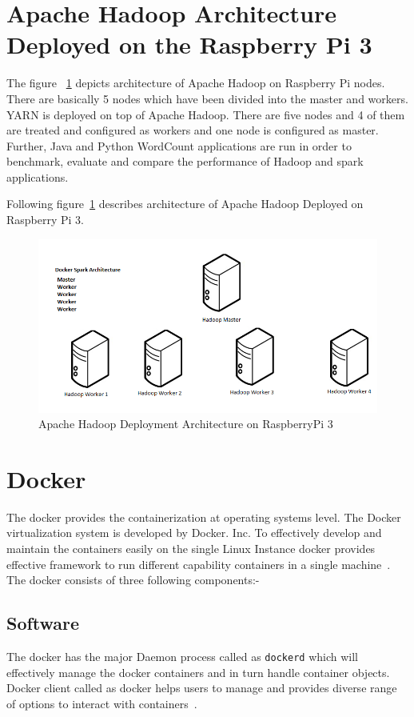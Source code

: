 \section{Apache Hadoop Architecture Deployed on the Raspberry Pi 3}

The figure ~\ref{s:archihadoop} depicts 
architecture of Apache Hadoop on 
Raspberry Pi nodes. There are basically 5 nodes which have been 
divided into the master and workers. 
YARN is deployed on top of Apache Hadoop. 
There are five nodes and 4 of them are treated and 
configured as workers and one node is configured as 
master. Further, Java and Python WordCount applications are run 
in order to benchmark, evaluate and compare the performance
 of Hadoop and spark applications.

Following figure~\ref{s:archihadoop} describes architecture of Apache 
Hadoop Deployed on Raspberry Pi 3.

\begin{figure}[!ht]
\centering\includegraphics[width=\textwidth]{images/RaspberryPiSpark.png}
\caption{Apache Hadoop Deployment Architecture on 
RaspberryPi 3}\label{s:archihadoop}
\end{figure}

\section{Docker}

The docker provides the containerization at operating systems level. 
The Docker virtualization system is developed by Docker. Inc. 
To effectively develop and maintain the containers easily
 on the single Linux Instance docker provides effective
 framework to run different capability
 containers in a single machine~\cite{hid-sp18-412-docker_wikepedia}. 
The docker consists of three following components:-

\subsection{Software}
The docker has the major Daemon process called as \verb|dockerd| 
which will effectively manage the docker containers and in turn 
handle container objects. Docker client called as docker
 helps users to manage and provides diverse range of options
 to interact with containers~\cite{hid-sp18-412-docker_wikepedia}. 

